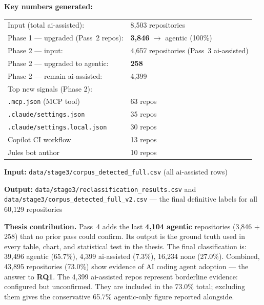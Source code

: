 \documentclass[11pt,a4paper]{article}
\begin{document}
\begin{numbersbox}
\textbf{Key numbers generated:}\\[2pt]
\begin{tabular}{@{}ll@{}}
Input (total ai-assisted):              & 8,503 repositories \\
Phase 1 --- upgraded (Pass~2 repos):   & \textbf{3,846} $\rightarrow$ agentic (100\%) \\
Phase 2 --- input:                     & 4,657 repositories (Pass~3 ai-assisted) \\
Phase 2 --- upgraded to agentic:       & \textbf{258} \\
Phase 2 --- remain ai-assisted:        & 4,399 \\[4pt]
Top new signals (Phase 2):             & \\
\quad \texttt{.mcp.json} (MCP tool)    & 63 repos \\
\quad \texttt{.claude/settings.json}   & 35 repos \\
\quad \texttt{.claude/settings.local.json} & 30 repos \\
\quad Copilot CI workflow              & 13 repos \\
\quad Jules bot author                 & 10 repos \\
\end{tabular}
\end{numbersbox}

\textbf{Input:} \texttt{data/stage3/corpus\_detected\_full.csv} (all ai-assisted rows)

\textbf{Output:} \texttt{data/stage3/reclassification\_results.csv} and
\texttt{data/stage3/corpus\_detected\_full\_v2.csv} --- the final definitive
labels for all 60,129 repositories

\begin{outputbox}
\textbf{Thesis contribution.}
Pass~4 adds the last \textbf{4,104 agentic} repositories (3,846 + 258)
that no prior pass could confirm. Its output is the ground truth used in
every table, chart, and statistical test in the thesis. The final
classification is: 39,496 agentic (65.7\%), 4,399 ai-assisted (7.3\%),
16,234 none (27.0\%). Combined, 43,895 repositories (73.0\%) show evidence
of AI coding agent adoption --- the answer to \textbf{RQ1}. The 4,399
ai-assisted repos represent borderline evidence: configured but unconfirmed.
They are included in the 73.0\% total; excluding them gives the conservative
65.7\% agentic-only figure reported alongside.
\end{outputbox}
\end{document}
